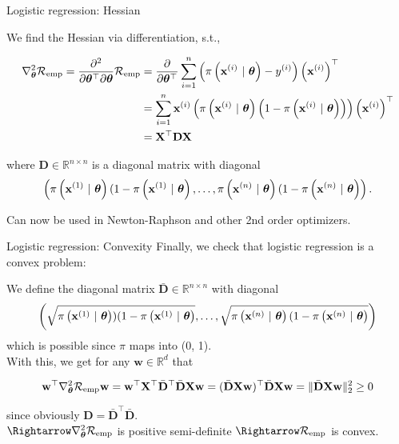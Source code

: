 \documentclass[11pt,compress,t,notes=noshow, xcolor=table]{beamer}
\begin{document}
\begin{vbframe}{Logistic regression: Hessian}

We find the Hessian via differentiation, s.t.,

{\small
\begin{align*}
  \nabla^2_{\thetav}\riske  = \frac{\partial^2}{\partial{\thetav^\top}\partial\thetav}\riske  & =  
 \frac{\partial}{\partial{\thetav^\top}} \sumin \left(\pixit - \yi\right)\left(\xi\right)^\top\\
 & =  
  \sum^n_{i=1}\xi \left(\pixit\left(1-\pixit\right)\right)\left(\xi\right)^\top\\
  & =  
\mathbf{X}^\top \mathbf{D} \mathbf{X}\\
\end{align*}

where $\mathbf{D} \in \mathbb{R}^{n\times n}$ is a diagonal matrix with diagonal 
$$\left(\pixit[1](1-\pixit[1], \dots, \pixit[n](1-\pixit[n]\right).$$
}

Can now be used in Newton-Raphson and other 2nd order optimizers.


\end{vbframe}

\begin{vbframe}{Logistic regression: Convexity}
Finally, we check that logistic regression is a convex problem:
\vspace*{0.3cm}

We define the diagonal matrix $\bar{\mathbf{D}} \in \mathbb{R}^{n \times n}$ with diagonal 
$$\left(\sqrt{\pixit[1])(1-\pixit[1]}, \dots, \sqrt{\pixit[n](1-\pixit[n]}\right) $$
which is possible since $\pi$ maps into (0, 1). \\
\vspace*{0.3cm}
With this, we get for any $\mathbf{w} \in \mathbb{R}^d$ that

$$\mathbf{w}^\top  \nabla^2_{\thetav}\riske \mathbf{w} =   \mathbf{w}^\top  \mathbf{X}^\top \bar{\mathbf{D}}^\top \bar{\mathbf{D}}\mathbf{X} \mathbf{w} = (\bar{\mathbf{D}}\mathbf{X} \mathbf{w})^\top\bar{\mathbf{D}}\mathbf{X} \mathbf{w} = \Vert \bar{\mathbf{D}}\mathbf{X} \mathbf{w} \Vert^2_2 \geq 0$$

since obviously $\mathbf{D} = \bar{\mathbf{D}}^\top \bar{\mathbf{D}}.$ \\
\vspace*{0.3cm}
$\Rightarrow \nabla^2_{\thetav}\riske$ is positive semi-definite $\Rightarrow \riske$ is convex.

\end{vbframe}

\endlecture
\end{document}
